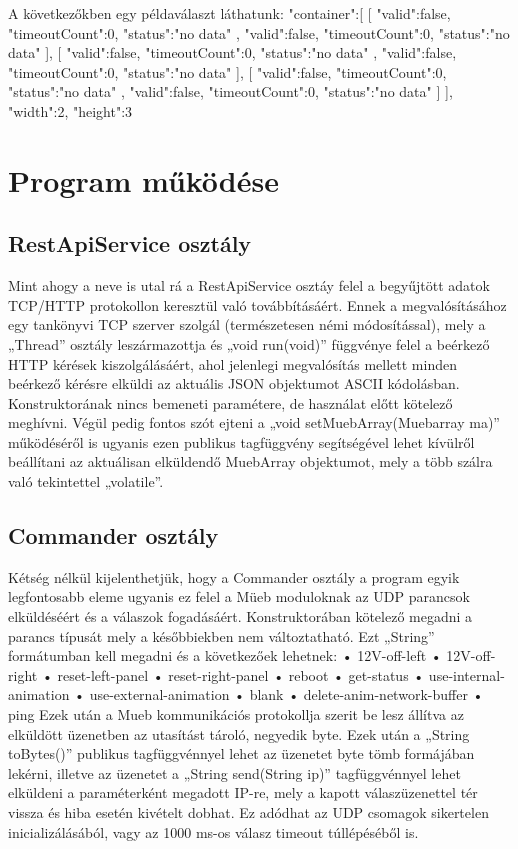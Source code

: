 \documentclass[a4paper,12pt]{article}
\begin{document}
A következőkben egy példaválaszt láthatunk:
{
"container":[
[
{
"valid":false,
"timeoutCount":0,
"status":"no data"
},
{
"valid":false,
"timeoutCount":0,
"status":"no data"
}
],
[
{
"valid":false,
"timeoutCount":0,
"status":"no data"
},
{
"valid":false,
"timeoutCount":0,
"status":"no data"
}
],
[
{
"valid":false,
"timeoutCount":0,
"status":"no data"
},
{
"valid":false,
"timeoutCount":0,
"status":"no data"
}
]
],
"width":2,
"height":3
}

\chapter{Program működése}

\section{RestApiService osztály}

Mint ahogy a neve is utal rá a RestApiService osztáy felel a begyűjtött adatok TCP/HTTP protokollon keresztül való továbbításáért. Ennek a megvalósításához egy tankönyvi TCP szerver szolgál (természetesen némi módosítással), mely a „Thread” osztály leszármazottja és „void run(void)” függvénye felel a beérkező HTTP kérések kiszolgálásáért, ahol jelenlegi megvalósítás mellett minden beérkező kérésre elküldi az aktuális JSON objektumot ASCII kódolásban. Konstruktorának nincs bemeneti paramétere, de használat előtt kötelező meghívni. Végül pedig fontos szót ejteni a „void setMuebArray(Muebarray ma)” működéséről is ugyanis ezen publikus tagfüggvény segítségével lehet kívülről beállítani az aktuálisan elküldendő MuebArray objektumot, mely a több szálra való tekintettel „volatile”.

\section{Commander osztály}

Kétség nélkül kijelenthetjük, hogy a Commander osztály a program egyik legfontosabb eleme ugyanis ez felel a Müeb moduloknak az UDP parancsok elküldéséért és a válaszok fogadásáért. Konstruktorában kötelező megadni a parancs típusát mely a későbbiekben nem változtatható. Ezt „String” formátumban kell megadni és a következőek lehetnek:
•	12V-off-left
•	12V-off-right
•	reset-left-panel
•	reset-right-panel
•	reboot
•	get-status
•	use-internal-animation
•	use-external-animation
•	blank
•	delete-anim-network-buffer
•	ping
Ezek után a Mueb kommunikációs protokollja szerit be lesz állítva az elküldött üzenetben az utasítást tároló, negyedik byte. Ezek után a „String toBytes()” publikus tagfüggvénnyel lehet az üzenetet byte tömb formájában lekérni, illetve az üzenetet a „String send(String ip)” tagfüggvénnyel lehet elküldeni a paraméterként megadott IP-re, mely a kapott válaszüzenettel tér vissza és hiba esetén kivételt dobhat. Ez adódhat az UDP csomagok sikertelen inicializálásából, vagy az 1000 ms-os válasz timeout túllépéséből is.
\end{document}
